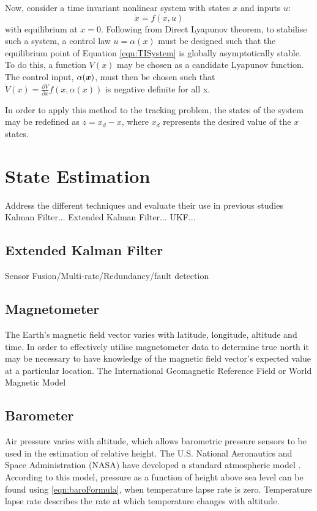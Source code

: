 Now, consider a time invariant nonlinear system with states $x$ and inputs $u$:
\begin{equation}\label{eqn:TISystem}
\dot{x}=f(x,u)
\end{equation}
with equilibrium at $x=0$. Following from Direct Lyapunov theorem, to stabilise such a system, a control law $u=\alpha(x)$ must be designed such that the equilibrium point of Equation \ref{eqn:TISystem} is globally asymptotically stable. To do this, a function $V(x)$ may be chosen as a candidate Lyapunov function. The control input, $\alpha(\textbf{\textit{x}})$, must then be chosen such that $\dot{V}(x)=\frac{\partial V}{\partial x}f(x,\alpha(x))$ is negative definite for all x. 

In order to apply this method to the tracking problem, the states of the system may be redefined as $z=x_{d}-x$, where $x_{d}$ represents the desired value of the $x$ states.









\section{State Estimation}
Address the different techniques and evaluate their use in previous studies
Kalman Filter...
Extended Kalman Filter...
UKF...

\subsection{Extended Kalman Filter}\label{section:EKFBackground}

Sensor Fusion/Multi-rate/Redundancy/fault detection

\subsection{Magnetometer}
The Earth's magnetic field vector varies with latitude, longitude, altitude and time. In order to effectively utilise magnetometer data to determine true north it may be necessary to have knowledge of the magnetic field vector's expected value at a particular location. The International Geomagnetic Reference Field or World Magnetic Model

\subsection{Barometer}\label{section:barometerBackground}
Air pressure varies with altitude, which allows barometric pressure sensors to be used in the estimation of relative height. The U.S. National Aeronautics and Space Administration (NASA) have developed a standard atmospheric model \cite{Oceanic1976}. According to this model, pressure as a function of height above sea level can be found using \eqref{eqn:baroFormula}, when temperature lapse rate is zero. Temperature lapse rate describes the rate at which temperature changes with altitude. 

